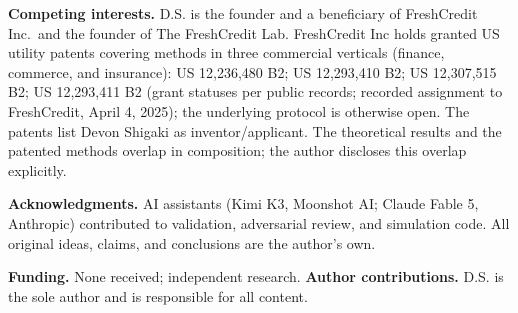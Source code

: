 \documentclass[
]{article}
\begin{document}
\textbf{Competing interests.} D.S. is the founder and a beneficiary of
FreshCredit Inc.~and the founder of The FreshCredit Lab. FreshCredit Inc
holds granted US utility patents covering methods in three commercial
verticals (finance, commerce, and insurance): US 12,236,480 B2; US
12,293,410 B2; US 12,307,515 B2; US 12,293,411 B2 (grant statuses per
public records; recorded assignment to FreshCredit, April 4, 2025); the
underlying protocol is otherwise open. The patents list Devon Shigaki as
inventor/applicant. The theoretical results and the patented methods
overlap in composition; the author discloses this overlap explicitly.

\textbf{Acknowledgments.} AI assistants (Kimi K3, Moonshot AI; Claude
Fable 5, Anthropic) contributed to validation, adversarial review, and
simulation code. All original ideas, claims, and conclusions are the
author's own.

\textbf{Funding.} None received; independent research. \textbf{Author
contributions.} D.S. is the sole author and is responsible for all
content.
\end{document}
